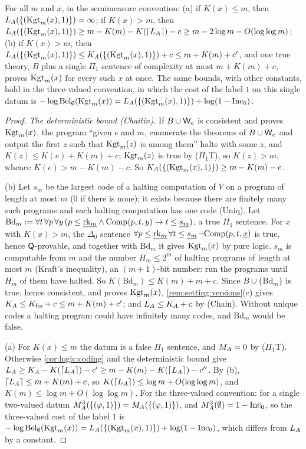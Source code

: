 \begin{corollary}\label{cor:logic:chaitin}
For all $m$ and $x$, in the semimeasure convention:
(a) if $K(x)\le m$, then $L_{A}(\{(\mathrm{Kgt}_m(x),1)\})=\infty$; if $K(x)>m$, then $L_{A}(\{(\mathrm{Kgt}_m(x),1)\})\ge m-K(m)-K(\lceil L_{A}\rceil)-c\ge m-2\log m-O(\log\log m)$;
(b) if $K(x)>m$, then $L_{A}(\{(\mathrm{Kgt}_m(x),1)\})\le K_{A}(\{(\mathrm{Kgt}_m(x),1)\})+c\le m+K(m)+c'$, and one true theory, $B$ plus a single $\Pi_1$ sentence of complexity at most $m+K(m)+c$, proves $\mathrm{Kgt}_m(x)$ for every such $x$ at once.
The same bounds, with other constants, hold in the three-valued convention, in which the cost of the label $1$ on this single datum is $-\log\mathrm{Bel}_\emptyset(\mathrm{Kgt}_m(x))=L_{A}(\{(\mathrm{Kgt}_m(x),1)\})+\log(1-\mathrm{Inc}_0)$.
\end{corollary}

\begin{proof}
\emph{The deterministic bound (Chaitin).} If $B\cup\mathsf{W}_{e}$ is consistent and proves $\mathrm{Kgt}_m(x)$, the program ``given $e$ and $m$, enumerate the theorems of $B\cup\mathsf{W}_{e}$ and output the first $z$ such that $\mathrm{Kgt}_m(z)$ is among them'' halts with some $z$, and $K(z)\le K(e)+K(m)+c$; $\mathrm{Kgt}_m(z)$ is true by ($\Pi_1$T), so $K(z)>m$, whence $K(e)>m-K(m)-c$. So $K_{A}(\{(\mathrm{Kgt}_m(x),1)\})\ge m-K(m)-c$.

(b) Let $s_m$ be the largest code of a halting computation of $V$ on a program of length at most $m$ ($0$ if there is none); it exists because there are finitely many such programs and each halting computation has one code (Uniq). Let $\mathrm{Bd}_m:=\forall t\,\forall p\,\forall y\,(p\le\underline{\mathrm{rk}_m}\wedge\mathrm{Comp}(p,t,y)\to t\le\underline{s_m})$, a true $\Pi_1$ sentence. For $x$ with $K(x)>m$, the $\Delta_0$ sentence $\forall p\le\underline{\mathrm{rk}_m}\,\forall t\le\underline{s_m}\,\neg\mathrm{Comp}(p,t,\underline{x})$ is true, hence $\mathsf{Q}$-provable, and together with $\mathrm{Bd}_m$ it gives $\mathrm{Kgt}_m(x)$ by pure logic. $s_m$ is computable from $m$ and the number $H_m\le2^m$ of halting programs of length at most $m$ (Kraft's inequality), an $(m+1)$-bit number: run the programs until $H_m$ of them have halted. So $K(\mathrm{Bd}_m)\le K(m)+m+c$. Since $B\cup\{\mathrm{Bd}_m\}$ is true, hence consistent, and proves $\mathrm{Kgt}_m(x)$, \cref{rem:setting:versions}(c) gives $K_{A}\le K_{\mathrm{fin}}+c\le m+K(m)+c'$; and $L_{A}\le K_{A}+c$ by (Chain). Without unique codes a halting program could have infinitely many codes, and $\mathrm{Bd}_m$ would be false.

(a) For $K(x)\le m$ the datum is a false $\Pi_1$ sentence, and $M_{A}=0$ by ($\Pi_1$T). Otherwise \cref{cor:logic:coding} and the deterministic bound give $L_{A}\ge K_{A}-K(\lceil L_{A}\rceil)-c'\ge m-K(m)-K(\lceil L_{A}\rceil)-c''$. By (b), $\lceil L_{A}\rceil\le m+K(m)+c$, so $K(\lceil L_{A}\rceil)\le\log m+O(\log\log m)$, and $K(m)\le\log m+O(\log\log m)$. For the three-valued convention: for a single two-valued datum $M_{A}^{3}(\{(\varphi,1)\})=M_{A}(\{(\varphi,1)\})$, and $M_{A}^{3}(\emptyset)=1-\mathrm{Inc}_0$, so the three-valued cost of the label $1$ is $-\log\mathrm{Bel}_\emptyset(\mathrm{Kgt}_m(x))=L_{A}(\{(\mathrm{Kgt}_m(x),1)\})+\log(1-\mathrm{Inc}_0)$, which differs from $L_{A}$ by a constant.
\end{proof}

